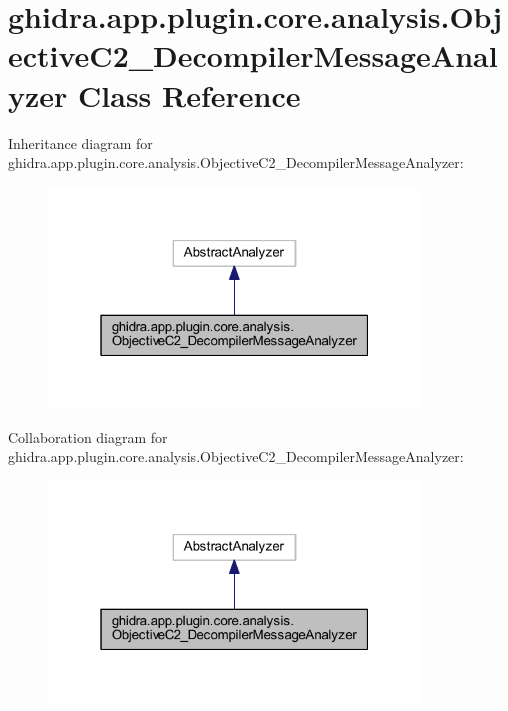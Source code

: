 \hypertarget{classghidra_1_1app_1_1plugin_1_1core_1_1analysis_1_1_objective_c2___decompiler_message_analyzer}{}\section{ghidra.\+app.\+plugin.\+core.\+analysis.\+Objective\+C2\+\_\+\+Decompiler\+Message\+Analyzer Class Reference}
\label{classghidra_1_1app_1_1plugin_1_1core_1_1analysis_1_1_objective_c2___decompiler_message_analyzer}


Inheritance diagram for ghidra.\+app.\+plugin.\+core.\+analysis.\+Objective\+C2\+\_\+\+Decompiler\+Message\+Analyzer\+:
\nopagebreak
\begin{figure}[H]
\begin{center}
\leavevmode
\includegraphics[width=280pt]{classghidra_1_1app_1_1plugin_1_1core_1_1analysis_1_1_objective_c2___decompiler_message_analyzer__inherit__graph}
\end{center}
\end{figure}


Collaboration diagram for ghidra.\+app.\+plugin.\+core.\+analysis.\+Objective\+C2\+\_\+\+Decompiler\+Message\+Analyzer\+:
\nopagebreak
\begin{figure}[H]
\begin{center}
\leavevmode
\includegraphics[width=280pt]{classghidra_1_1app_1_1plugin_1_1core_1_1analysis_1_1_objective_c2___decompiler_message_analyzer__coll__graph}
\end{center}
\end{figure}
